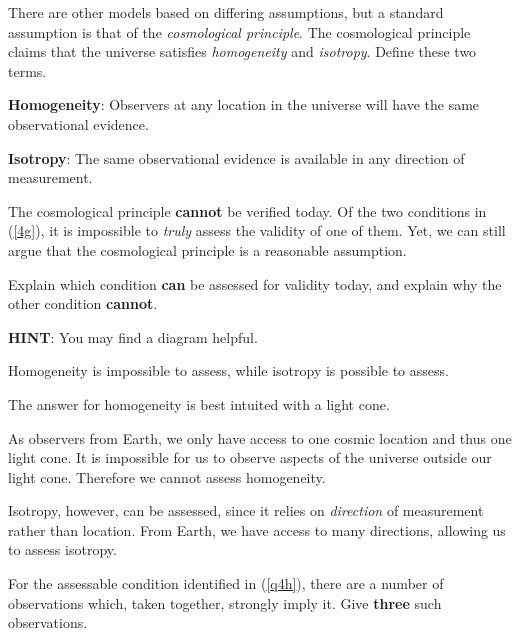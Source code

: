 \documentclass[a4paper,11pt]{exam}
\begin{document}
\begin{questions}
{	There are other models based on differing assumptions, but a standard assumption is that of the \textit{cosmological principle}.
}
\vspace*{-10pt}
\question[1]\label{4g}
	The cosmological principle claims that the universe satisfies \textit{homogeneity} and \textit{isotropy}. Define these two terms.
	\droppoints
	\begin{solution}
		\textbf{Homogeneity}: Observers at any location in the universe will have the same observational evidence.
		
		\textbf{Isotropy}: The same observational evidence is available in any direction of measurement.
	\end{solution}
	
\filbreak
\question[2]\label{q4h}
	The cosmological principle \textbf{cannot} be verified today. Of the two conditions in (\ref{4g}), it is impossible to \textit{truly} assess the validity of one of them. Yet, we can still argue that the cosmological principle is a reasonable assumption.
	
	Explain which condition \textbf{can} be assessed for validity today, and explain why the other condition \textbf{cannot}.
	\droppoints
	
	\textbf{HINT}: You may find a diagram helpful.
	\begin{solution}
		Homogeneity is impossible to assess, while isotropy is possible to assess.
		
		The answer for homogeneity is best intuited with a light cone.

		As observers from Earth, we only have access to one cosmic location and thus one light cone. It is impossible for us to observe aspects of the universe outside our light cone. Therefore we cannot assess homogeneity.
		
		Isotropy, however, can be assessed, since it relies on \textit{direction} of measurement rather than location. From Earth, we have access to many directions, allowing us to assess isotropy.
	\end{solution}
	
\setcounter{question}{9}
\question[2]
	For the assessable condition identified in (\ref{q4h}), there are a number of observations which, taken together, strongly imply it. Give \textbf{three} such observations.
	\droppoints
	

\end{questions}
\end{document}

